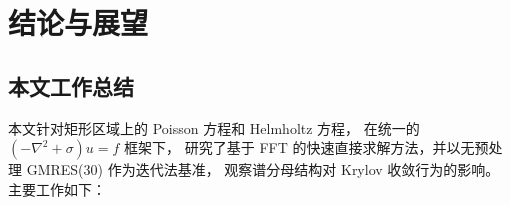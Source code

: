 \section{结论与展望}
\label{sec:conclusion}

\subsection{本文工作总结}

本文针对矩形区域上的 Poisson 方程和 Helmholtz 方程，
在统一的 $(-\nabla^2+\sigma)u=f$ 框架下，
研究了基于 FFT 的快速直接求解方法，并以无预处理 GMRES(30) 作为迭代法基准，
观察谱分母结构对 Krylov 收敛行为的影响。
主要工作如下：

